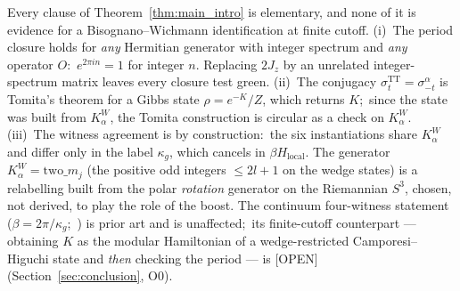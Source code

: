 \documentclass[11pt,a4paper]{article}
\theoremstyle{plain}
\theoremstyle{definition}
\newcommand{\sthree}{S^{3}}
\newcommand{\TT}{\mathrm{TT}}
\begin{document}
Every clause of Theorem~\ref{thm:main_intro} is elementary, and none
of it is evidence for a Bisognano--Wichmann identification at finite
cutoff.  (i)~The period closure holds for \emph{any} Hermitian
generator with integer spectrum and \emph{any} operator $O$:\
$e^{2\pi i n} = 1$ for integer $n$.  Replacing $2J_z$ by an unrelated
integer-spectrum matrix leaves every closure test green.
(ii)~The conjugacy $\sigma_t^{\TT} = \sigma_{-t}^{\alpha}$ is Tomita's
theorem for a Gibbs state $\rho = e^{-K}/Z$, which returns $K$;\ since
the state was built from $K_\alpha^W$, the Tomita construction is
circular as a check on $K_\alpha^W$.  (iii)~The witness agreement is
by construction:\ the six instantiations share $K_\alpha^W$ and differ
only in the label $\kappa_g$, which cancels in $\beta H_{\mathrm{local}}$.
The generator $K_\alpha^W = \mathrm{two}\_m_j$ (the positive odd
integers $\le 2l+1$ on the wedge states) is a relabelling built from
the polar \emph{rotation} generator on the Riemannian $\sthree$, chosen,
not derived, to play the role of the boost.  The continuum four-witness statement
($\beta = 2\pi/\kappa_g$;\
\cite{bisognano_wichmann1976, hartle_hawking1976, sewell1982, unruh1976})
is prior art and is unaffected;\ its finite-cutoff counterpart ---
obtaining $K$ as the modular Hamiltonian of a wedge-restricted
Camporesi--Higuchi state and \emph{then} checking the period --- is
[OPEN] (Section~\ref{sec:conclusion}, O0).
\end{document}
